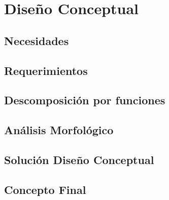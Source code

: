 \chapter{Dise\~no Conceptual}

\section{Necesidades}

\section{Requerimientos}

\section{Descomposici\'on por funciones}

\section{An\'alisis Morfol\'ogico}

\section{Soluci\'on Dise\~no Conceptual}

\section{Concepto Final}
